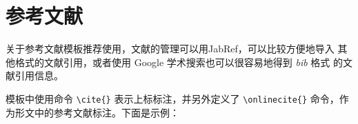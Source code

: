 
\section{参考文献}
\label{sec:bib}

关于参考文献模板推荐使用\BibTeX{}，文献的管理可以用JabRef，可以比较方便地导入
其他格式的文献引用，或者使用 Google 学术搜索也可以很容易地得到 \emph{bib} 格式
的文献引用信息。

模板中使用命令 \verb|\cite{}| 表示上标标注，并另外定义了 \verb|\onlinecite{}|
命令，作为形文中的参考文献标注。下面是示例：




